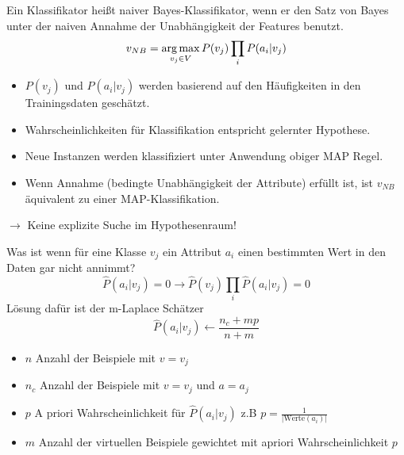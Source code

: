 Ein Klassifikator heißt naiver Bayes-Klassifikator, wenn er den Satz von Bayes
unter der naiven Annahme der Unabhängigkeit der Features benutzt.\\
\begin{displaymath}
        v_{NB} = \operatorname*{arg\,max}_{v_j \in V} P(v_j) \prod_{i} P(a_i|v_j)
\end{displaymath}

\begin{itemize}
    \item $P(v_j)$ und $P(a_i|v_j)$ werden basierend auf den Häufigkeiten in den
    Trainingsdaten geschätzt.
    \item Wahrscheinlichkeiten für Klassifikation entspricht
    gelernter Hypothese.
    \item Neue Instanzen werden klassifiziert unter Anwendung obiger MAP Regel.
    \item Wenn Annahme (bedingte Unabhängigkeit der Attribute) erfüllt ist, ist
     $v_{NB}$ äquivalent zu einer MAP-Klassifikation.
\end{itemize}
$\rightarrow$ Keine explizite Suche im Hypothesenraum!

Was ist wenn für eine Klasse $v_j$ ein Attribut $a_i$ einen bestimmten Wert
in den Daten gar nicht annimmt?
\begin{displaymath}
    \hat{P}(a_i|v_j) = 0 \rightarrow \hat{P}(v_j) \prod_{i} \hat{P}(a_i|v_j) = 0
\end{displaymath}
Lösung dafür ist der m-Laplace Schätzer
\begin{displaymath}
    \hat{P}(a_i|v_j) \leftarrow \frac{n_c + mp}{n+m}
\end{displaymath}
\begin{itemize}
    \item $n$ Anzahl der Beispiele mit $v = v_j$
    \item $n_c$ Anzahl der Beispiele mit $v = v_j$ und $a = a_j$
    \item $p$ A priori Wahrscheinlichkeit für $\hat{P}(a_i|v_j)$ z.B $p =
    \frac{1}{|\text{Werte}(a_i)|}$
    \item $m$ Anzahl der virtuellen Beispiele gewichtet mit apriori
    Wahrscheinlichkeit $p$
\end{itemize}


